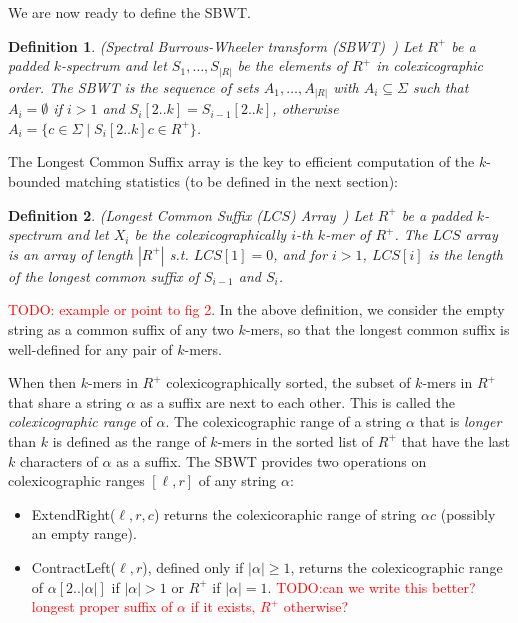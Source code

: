 \documentclass[unnumsec,webpdf,contemporary,large]{oup-authoring-template}%
\theoremstyle{thmstyleone}%
\theoremstyle{thmstyletwo}%
\theoremstyle{thmstylethree}%
\newtheorem{definition}{Definition}
\begin{document}
We are now ready to define the SBWT.

\begin{definition}\label{def:SBWT}(Spectral Burrows-Wheeler transform (SBWT)~\cite{alanko2023small}) Let $R^+$ be a padded $k$-spectrum and let $S_1, \ldots, S_{|R|}$ be the elements of $R^+$ in colexicographic order. The SBWT is the sequence of sets $A_1, \ldots, A_{|R|}$ with $A_i \subseteq \Sigma$ such that $A_i = \emptyset$ if $i > 1$ and $S_i[2..k] = S_{i-1}[2..k]$, otherwise $A_i = \{c \in \Sigma \; | \; S_i[2..k]c \in R^+\}$.
\end{definition}
The Longest Common Suffix array is the key to efficient computation of the $k$-bounded matching statistics (to be defined in the next section):

\begin{definition}\label{def:LCS-array}(Longest Common Suffix ($LCS$) Array~\cite{alanko2023longest})     
Let $R^+$ be a padded $k$-spectrum and let $X_i$ be the colexicographically $i$-th $k$-mer of $R^+$. 
The $LCS$ array is an array of length $|R^+|$ s.t. $LCS[1] = 0$, and for $i > 1$, $LCS[i]$ is the length of the longest common suffix of $S_{i-1}$ and $S_i$.
\end{definition}
\textcolor{red}{TODO: example or point to fig 2}. In the above definition, we consider the empty string as a common suffix of any two $k$-mers, so that the longest common suffix is well-defined for any pair of $k$-mers.

When then $k$-mers in $R^+$ colexicographically sorted, the subset of $k$-mers in $R^+$ that share a string $\alpha$ as a suffix are next to each other. This is called the \emph{colexicographic range} of $\alpha$. The colexicographic range of a string $\alpha$ that is \emph{longer} than $k$ is defined as the range of $k$-mers in the sorted list of $R^+$ that have the last $k$ characters of $\alpha$ as a suffix. The SBWT provides two operations on colexicographic ranges $[\ell, r]$ of any string $\alpha$: 

\begin{itemize}
\item ExtendRight($\ell, r, c$) returns the colexicoraphic range of string $\alpha c$ (possibly an empty range).
\item ContractLeft($\ell, r$), defined only if $|\alpha| \geq 1$, returns the colexicographic range of $\alpha[2..|\alpha|]$ if $|\alpha| >1$ or $R^+$ if $|\alpha|=1$. \textcolor{red}{TODO:can we write this better? longest proper suffix of $\alpha$ if it exists, $R^+$ otherwise?}
\end{itemize}
\end{document}
